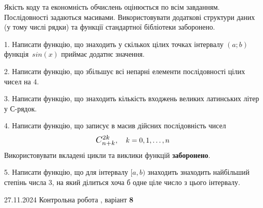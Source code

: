 \documentclass[12pt, ukrainian]{article}
\begin{document}
{{{{{{%

{
Якість коду та економність обчислень оцінюється по всім завданням. Послідовності задаються масивами. Використовувати додаткові структури даних (у тому числі рядки) та функції стандартної бібліотеки заборонено.

\vspace{2mm}

\begin {large}
1. Написати функцію, що знаходить у скількох цілих точках інтервалу $(a; b)$ функція~$sin(x)$ приймає додатнє значення.

\vspace{2mm}


2. Написати функцію, що збільшує всі непарні елементи послідовності цілих чисел на 4.

\vspace{2mm}


3. Написати функцію, що знаходить кількість входжень великих латинських літер у С-рядок.

\vspace{2mm}


4. 
Написати функцію, що записує в масив дійсних послідовність чисел
$$\scalebox{1.2}{$C_{n+k}^{2k}$}, \quad k=0,1,\ldots,n$$
Використовувати вкладені цикли та виклики функцій \textbf{заборонено}.

\vspace{2mm}


5. Написати функцію, що для інтервалу $[a, b)$ знаходить знаходить найбільший степінь числа 3, на який ділиться хоча б одне ціле число з цього інтервалу.

\vspace{2mm}

\end{large}
\vspace{35mm}


{{27.11.2024 Контрольна робота , варіант  \No \textbf { 8 }\par}}

}}}}}}}
\end{document}
